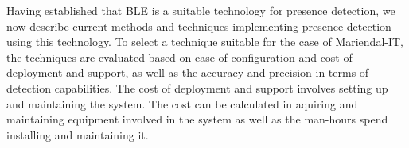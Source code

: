 Having established that BLE is a suitable technology for presence detection, we now describe current methods and techniques implementing presence detection using this technology.
To select a technique suitable for the case of Mariendal-IT, the techniques are evaluated based on ease of configuration and cost of deployment and support, as well as the accuracy and precision in terms of detection capabilities.
The cost of deployment and support involves setting up and maintaining the system. 
The cost can be calculated in aquiring and maintaining equipment involved in the system as well as the man-hours spend installing and maintaining it. 

